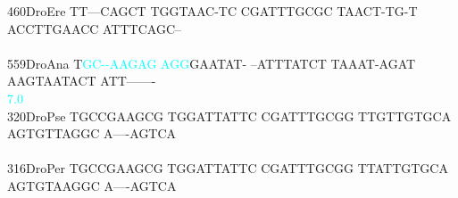 \documentclass[11pt,twoside,reqno,a4paper]{article}
\begin{document}
{460\hspace*{2\charwidth}DroEre	TT---CAGCT	TGGTAAC-TC	CGATTTGCGC	TAACT-TG-T	ACCTTGAACC	ATTTCAGC--	\\
\hspace*{5\charwidth}\hspace*{7\charwidth}\hspace*{1\charwidth}\hspace*{1\charwidth}\hspace*{1\charwidth}\hspace*{1\charwidth}\hspace*{1\charwidth}\hspace*{1\charwidth}\\
559\hspace*{2\charwidth}DroAna	T\textcolor{cyan}{G}\textcolor{cyan}{C}\textcolor{cyan}{-}\textcolor{cyan}{-}\textcolor{cyan}{A}\textcolor{cyan}{A}\textcolor{cyan}{G}\textcolor{cyan}{A}\textcolor{cyan}{G}	\textcolor{cyan}{A}\textcolor{cyan}{G}\textcolor{cyan}{G}GAATAT-	--ATTTATCT	TAAAT-AGAT	AAGTAATACT	ATT-------	\\
\hspace*{5\charwidth}\hspace*{7\charwidth}\hspace*{1\charwidth}\textcolor{cyan}{7.0}\hspace*{1\charwidth}\hspace*{1\charwidth}\hspace*{1\charwidth}\hspace*{1\charwidth}\hspace*{1\charwidth}\hspace*{1\charwidth}\\
320\hspace*{2\charwidth}DroPse	TGCCGAAGCG	TGGATTATTC	CGATTTGCGG	TTGTTGTGCA	AGTGTTAGGC	A----AGTCA	\\
\hspace*{5\charwidth}\hspace*{7\charwidth}\hspace*{1\charwidth}\hspace*{1\charwidth}\hspace*{1\charwidth}\hspace*{1\charwidth}\hspace*{1\charwidth}\hspace*{1\charwidth}\\
316\hspace*{2\charwidth}DroPer	TGCCGAAGCG	TGGATTATTC	CGATTTGCGG	TTATTGTGCA	AGTGTAAGGC	A----AGTCA	\\
}
\end{document}
